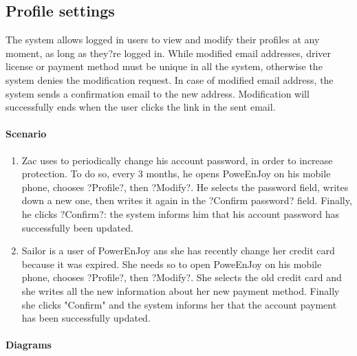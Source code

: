 \subsection{Profile settings}
The system allows logged in users to view and modify their profiles at any moment, as long as they?re logged in. While modified email addresses, driver license or payment method must be unique in all the system, otherwise the system denies the modification request. In case of modified email address, the system sends a confirmation email to the new address. Modification will successfully ends when the user clicks the link in the sent email.
\paragraph{Scenario}
\begin{enumerate}
	\item  Zac uses to periodically change his account password, in order to increase protection. To do so, every 3 months, he opens PoweEnJoy on his mobile phone, chooses ?Profile?, then ?Modify?. He selects the password field, writes down a new one, then writes it again in the ?Confirm password? field. Finally, he clicks ?Confirm?: the system informs him that his account password has successfully been updated.
	\item Sailor is a user of PowerEnJoy ans she has recently change her credit card because it was expired. She needs so to open PoweEnJoy on his mobile phone, chooses ?Profile?, then ?Modify?. She selects the old credit card and she writes all the new information about her new payment method. Finally she clicks "Confirm" and the system informs her that the account payment has been successfully updated.
\end{enumerate}
\paragraph{Diagrams}
